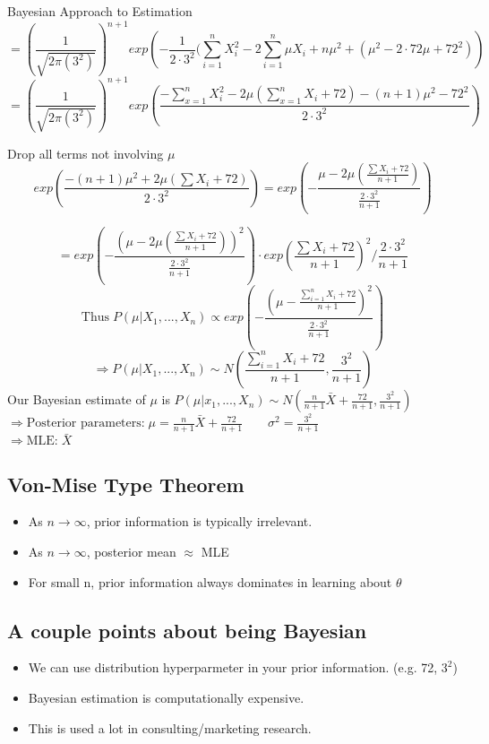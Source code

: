 \documentclass[12pt]{article}
\begin{document}
\begin{section}{Bayesian Approach to Estimation}
$$=\left(\frac{1}{\sqrt{2\pi(3^2)}}\right)^{n+1} exp\left(-\frac{1}{2\cdot3^2}
(\sum_{i=1}^n X_i^2 - 2\sum_{i=1}^n \mu X_i +n\mu^2
+(\mu^2 - 2\cdot72\mu+72^2)\right)$$
$$=\left(\frac{1}{\sqrt{2\pi(3^2)}}\right)^{n+1} exp\left(\frac{-\sum_{x=1}^n X_i^2 -2\mu(\sum_{x=1}^n X_i + 72) - (n+1)\mu^2 -72^2}{2\cdot 3^2}\right)$$

Drop all terms not involving $\mu$
$$exp\left(\frac{-(n+1)\mu^2+2\mu(\sum X_i + 72)}{2\cdot3^2}\right) = exp\left(-\frac{\mu - 2\mu(\frac{\sum X_i + 72}{n+1})}{\frac{2\cdot3^2}{n+1}}\right)$$

$$=exp\left(-\frac{(\mu - 2\mu(\frac{\sum X_i + 72}{n+1}))^2}{\frac{2\cdot3^2}{n+1}}\right)\cdot exp\left(\frac{\sum X_i + 72}{n+1}\right)^2 / \frac{2\cdot3^2}{n+1}$$
$$\text{Thus}\; P(\mu|X_1,...,X_n) \propto exp\left (-\frac{(\mu-\frac{\sum_{i=1}^n X_i + 72}{n+1})^2}{\frac{2\cdot 3^2}{n+1}} \right)$$
$$\Rightarrow P(\mu|X_1,...,X_n) \sim N\left(\frac{\sum_{i=1}^n X_i + 72}{n+1}, \frac{3^2}{n+1}\right)$$
\newline
Our Bayesian estimate of $\mu$ is $P(\mu|x_1,...,X_n) \sim N(\frac{n}{n+1} \bar{X} + \frac{72}{n+1}, \frac{3^2}{n+1})$\\

$\Rightarrow \text{Posterior parameters:}\; \mu = \frac{n}{n+1}\bar{X} + \frac{72}{n+1}\qquad \sigma^2 = \frac{3^2}{n+1}$\\ $\Rightarrow \text{MLE:}\; \bar{X}$

\subsection{Von-Mise Type Theorem}
\begin{itemize}
	\item As $n \rightarrow \infty$, prior information is typically irrelevant.
	\item As $n \rightarrow \infty$, posterior mean $\approx$ MLE
    \item For small n, prior information always dominates in learning about $\theta$
\end{itemize}

\subsection{A couple points about being Bayesian}
\begin{itemize}
	\item We can use distribution hyperparmeter in your prior information. (e.g. 72, $3^2$)
    \item Bayesian estimation is computationally expensive. 
    \item This is used a lot in consulting/marketing research.
\end{itemize}


\end{section}
\end{document}
